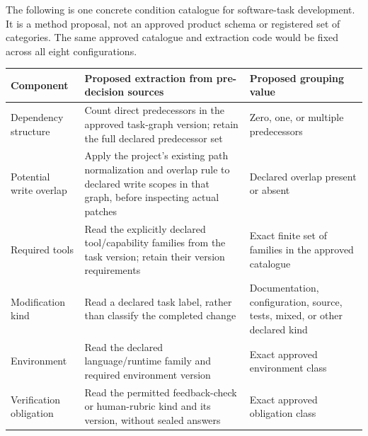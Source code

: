 \documentclass[
  english,
  11pt,
]{article}
\newcounter{none} %
\begin{document}
The following is one concrete condition catalogue for software-task
development. It is a method proposal, not an approved product schema or
registered set of categories. The same approved catalogue and extraction
code would be fixed across all eight configurations.

{\def\LTcaptype{none} %
\begin{longtable}[]{@{}
  >{\raggedright\arraybackslash}p{}
  >{\raggedright\arraybackslash}p{}
  >{\raggedright\arraybackslash}p{}@{}}
\toprule\noalign{}
\begin{minipage}[b]{\linewidth}\raggedright
Component
\end{minipage} & \begin{minipage}[b]{\linewidth}\raggedright
Proposed extraction from pre-decision sources
\end{minipage} & \begin{minipage}[b]{\linewidth}\raggedright
Proposed grouping value
\end{minipage} \\
\midrule\noalign{}
\endhead
\bottomrule\noalign{}
\endlastfoot
Dependency structure & Count direct predecessors in the approved
task-graph version; retain the full declared predecessor set & Zero,
one, or multiple predecessors \\
Potential write overlap & Apply the project's existing path
normalization and overlap rule to declared write scopes in that graph,
before inspecting actual patches & Declared overlap present or absent \\
Required tools & Read the explicitly declared tool/capability families
from the task version; retain their version requirements & Exact finite
set of families in the approved catalogue \\
Modification kind & Read a declared task label, rather than classify the
completed change & Documentation, configuration, source, tests, mixed,
or other declared kind \\
Environment & Read the declared language/runtime family and required
environment version & Exact approved environment class \\
Verification obligation & Read the permitted feedback-check or
human-rubric kind and its version, without sealed answers & Exact
approved obligation class \\
\end{longtable}
}
\end{document}
